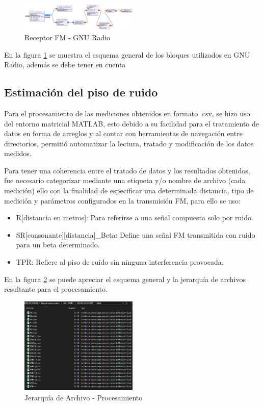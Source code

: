 \documentclass[conference]{IEEEtran}
\begin{document}
	\begin{figure}[h]
		\centering
		\includegraphics[width=0.5\textwidth]{media/receptor-fm}
		\caption{Receptor FM - GNU Radio}
		\label{fig:receptor-fm}
	\end{figure}
	
	En la figura \ref{fig:receptor-fm} se muestra el esquema general de los bloques utilizados en GNU Radio, además se debe tener en cuenta
	
	\subsection{ Estimación del piso de ruido }
	
	Para el procesamiento de las mediciones obtenidos en formato .csv, se hizo uso del entorno matricial MATLAB, esto debido a su facilidad para el tratamiento de datos en forma de arreglos y al contar con herramientas de navegación entre directorios, permitió automatizar la lectura, tratado y modificación de los datos medidos.
	
	Para tener una coherencia entre el tratado de datos y los resultados obtenidos, fue necesario categorizar mediante una etiqueta y/o nombre de archivo (cada medición) ello con la finalidad de especificar una determinada distancia, tipo de medición y parámetros configurados en la transmisión FM, para ello se uso:
	
	\begin{itemize}
		\item R[distancia en metros]: Para referirse a una señal compuesta solo por ruido.
		\item SR[consonante][distancia]\_Beta: Define una señal FM transmitida con ruido para un beta determinado.
		\item TPR: Refiere al piso de ruido sin ninguna interferencia provocada.
	\end{itemize}
	
	En la figura \ref{fig:jerarquia-archivos} se puede apreciar el esquema general y la jerarquía de archivos resultante para el procesamiento.
	
	\begin{figure}[h]
		\centering
		\includegraphics[width=0.5\textwidth]{media/jerarquia-archivos}
		\caption{Jerarquía de Archivo - Procesamiento}
		\label{fig:jerarquia-archivos}
	\end{figure}
	
\end{document}
